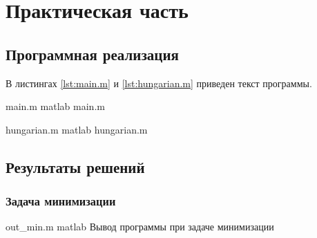 
\chapter{Практическая часть}

\section{Программная реализация}

В листингах \ref{lst:main.m} и \ref{lst:hungarian.m} приведен текст программы.

    {main.m} %
    {matlab} %
    {main.m} %

    {hungarian.m} %
    {matlab} %
    {hungarian.m} %

\section{Результаты решений}

\subsection{Задача минимизации}

    {out_min.m} %
    {matlab} %
    {Вывод программы при задаче минимизации} %





